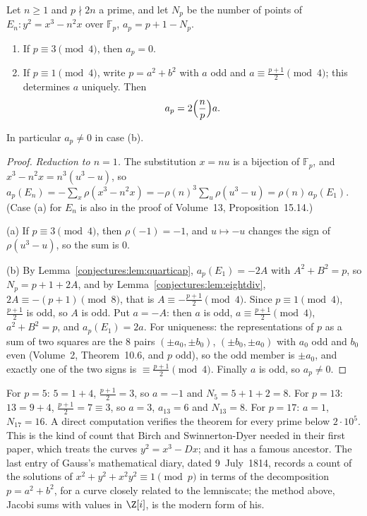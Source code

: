 \begin{theorem}\label{conjectures:thm:countEn}
Let $n\ge1$ and $p\nmid2n$ a prime, and let $N_p$ be the number of points of $E_n:y^2=x^3-n^2x$ over $\mathbb F_p$, $a_p=p+1-N_p$.
\begin{enumerate}[label=(\alph*)]
\item If $p\equiv3\pmod4$, then $a_p=0$.
\item If $p\equiv1\pmod4$, write $p=a^2+b^2$ with $a$ odd and $a\equiv\frac{p+1}2\pmod4$; this determines $a$ uniquely. Then
\[
a_p=2\Bigl(\frac np\Bigr)a.
\]
\end{enumerate}
In particular $a_p\ne0$ in case (b).
\end{theorem}
\begin{proof}
\emph{Reduction to $n=1$.} The substitution $x=nu$ is a bijection of $\mathbb F_p$, and $x^3-n^2x=n^3(u^3-u)$, so
$a_p(E_n)=-\sum_x\rho(x^3-n^2x)=-\rho(n)^3\sum_u\rho(u^3-u)=\rho(n)\,a_p(E_1)$. (Case (a) for $E_n$ is also in the proof of Volume~13, Proposition~15.14.)

(a) If $p\equiv3\pmod4$, then $\rho(-1)=-1$, and $u\mapsto-u$ changes the sign of $\rho(u^3-u)$, so the sum is $0$.

(b) By Lemma~\ref{conjectures:lem:quarticap}, $a_p(E_1)=-2A$ with $A^2+B^2=p$, so $N_p=p+1+2A$, and by Lemma~\ref{conjectures:lem:eightdiv}, $2A\equiv-(p+1)\pmod8$, that is
$A\equiv-\frac{p+1}2\pmod4$. Since $p\equiv1\pmod4$, $\frac{p+1}2$ is odd, so $A$ is odd. Put $a=-A$: then $a$ is odd, $a\equiv\frac{p+1}2\pmod4$, $a^2+B^2=p$,
and $a_p(E_1)=2a$. For uniqueness: the representations of $p$ as a sum of two squares are the $8$ pairs $(\pm a_0,\pm b_0)$, $(\pm b_0,\pm a_0)$ with $a_0$ odd
and $b_0$ even (Volume~2, Theorem~10.6, and $p$ odd), so the odd member is $\pm a_0$, and exactly one of the two signs is $\equiv\frac{p+1}2\pmod4$. Finally
$a$ is odd, so $a_p\ne0$.
\end{proof}

For $p=5$: $5=1+4$, $\frac{p+1}2=3$, so $a=-1$ and $N_5=5+1+2=8$. For $p=13$: $13=9+4$, $\frac{p+1}2=7\equiv3$, so $a=3$, $a_{13}=6$ and $N_{13}=8$. For
$p=17$: $a=1$, $N_{17}=16$. A direct computation verifies the theorem for every prime below $2\cdot10^5$. This is the kind of count that Birch and Swinnerton-Dyer
needed in their first paper, which treats the curves $y^2=x^3-Dx$; and it has a famous ancestor. The last entry of Gauss's mathematical diary, dated
9~July~1814, records a count of the solutions of $x^2+y^2+x^2y^2\equiv1\pmod p$ in terms of the decomposition $p=a^2+b^2$, for a curve closely related
to the lemniscate; the method above, Jacobi sums with values in $\Z[i]$, is the modern form of his.

